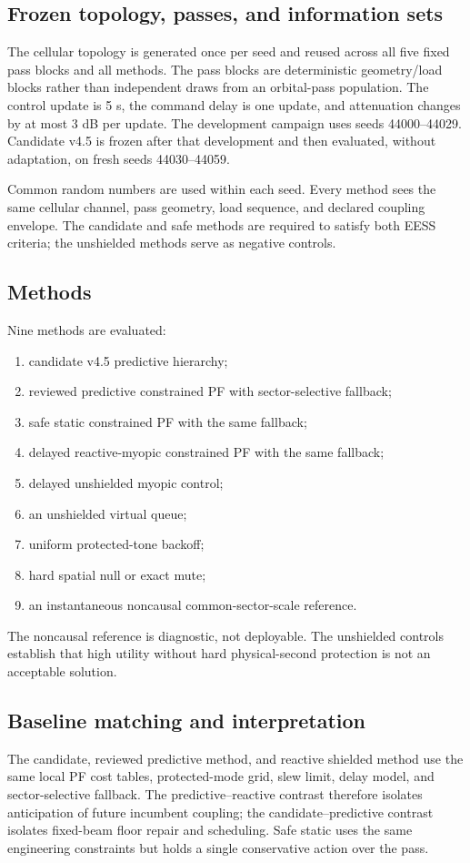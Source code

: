 \documentclass[journal]{IEEEtran}
\begin{document}
\subsection{Frozen topology, passes, and information sets}
The cellular topology is generated once per seed and reused across all five fixed pass blocks and all methods. The pass blocks are deterministic geometry/load blocks rather than independent draws from an orbital-pass population. The control update is 5 s, the command delay is one update, and attenuation changes by at most 3 dB per update. The development campaign uses seeds 44000--44029. Candidate v4.5 is frozen after that development and then evaluated, without adaptation, on fresh seeds 44030--44059.

Common random numbers are used within each seed. Every method sees the same cellular channel, pass geometry, load sequence, and declared coupling envelope. The candidate and safe methods are required to satisfy both EESS criteria; the unshielded methods serve as negative controls.

\subsection{Methods}
Nine methods are evaluated:
\begin{enumerate}
\item candidate v4.5 predictive hierarchy;
\item reviewed predictive constrained PF with sector-selective fallback;
\item safe static constrained PF with the same fallback;
\item delayed reactive-myopic constrained PF with the same fallback;
\item delayed unshielded myopic control;
\item an unshielded virtual queue;
\item uniform protected-tone backoff;
\item hard spatial null or exact mute;
\item an instantaneous noncausal common-sector-scale reference.
\end{enumerate}
The noncausal reference is diagnostic, not deployable. The unshielded controls establish that high utility without hard physical-second protection is not an acceptable solution.

\subsection{Baseline matching and interpretation}
The candidate, reviewed predictive method, and reactive shielded method use the same local PF cost tables, protected-mode grid, slew limit, delay model, and sector-selective fallback. The predictive--reactive contrast therefore isolates anticipation of future incumbent coupling; the candidate--predictive contrast isolates fixed-beam floor repair and scheduling. Safe static uses the same engineering constraints but holds a single conservative action over the pass.
\end{document}
